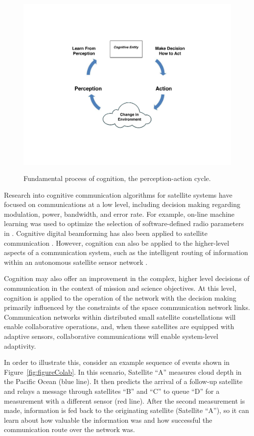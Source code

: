 \documentclass[conference]{IEEEtran}
\begin{document}
\begin{figure}[t!]
  \begin{center}
    \includegraphics[width=0.8\linewidth] {images/Figure1.pdf} \\
  \end{center}
  \caption{Fundamental process of cognition, the perception-action cycle.}
  \label{fig:figure1}
\end{figure}

Research into cognitive communication algorithms for satellite systems have
focused on communications at a low level, including decision making regarding
modulation, power, bandwidth, and error rate.  For example, on-line machine
learning was used to optimize the selection of software-defined radio
parameters in \cite{ref4}.  Cognitive digital beamforming has also been applied
to satellite communication \cite{ref5}.  However, cognition can also be applied
to the higher-level aspects of a communication system, such as the intelligent
routing of information within an autonomous satellite sensor network
\cite{ref7}.

Cognition may also offer an improvement in the complex, higher level decisions
of communication in the context of mission and science objectives.  At this
level, cognition is applied to the operation of the network with the decision
making primarily influenced by the constraints of the space communication
network links.  Communication networks within distributed small satellite
constellations will enable collaborative operations, and, when these satellites
are equipped with adaptive sensors, collaborative communications will enable
system-level adaptivity.

In order to illustrate this, consider an example sequence of events shown in
Figure~\ref{fig:figureColab}.  In this scenario, Satellite ``A'' measures
cloud depth in the Pacific Ocean (blue line).  It then predicts the arrival of a
follow-up satellite and relays a message through satellites ``B'' and ``C'' to
queue ``D'' for a measurement with a different sensor (red line).  After the
second measurement is made, information is fed back to the originating satellite
(Satellite ``A''), so it can learn about how valuable the information was and
how successful the communication route over the network was.
\end{document}
